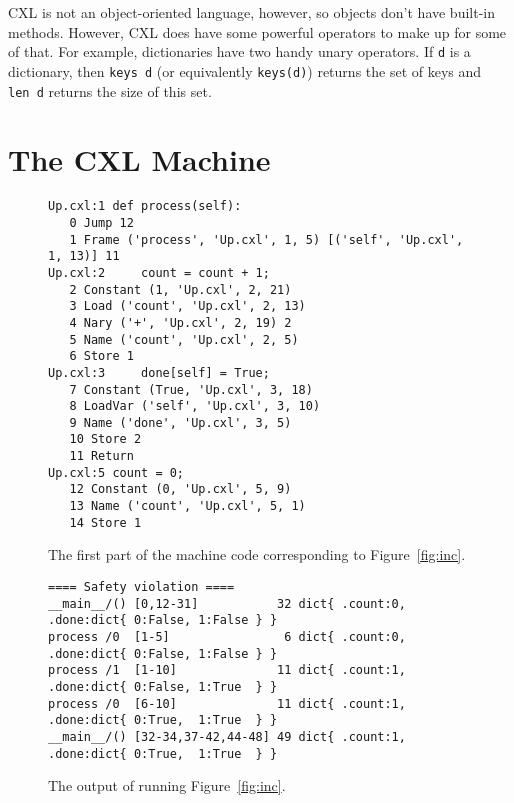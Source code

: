 \documentclass{report}
\newenvironment{code}{
\tcolorbox
}{
\endtcolorbox
}
\begin{document}
CXL is not an object-oriented language, however, so objects don't have
built-in methods.  However, CXL does have some powerful operators to
make up for some of that.
For example, dictionaries have two handy unary operators.
If \texttt{d} is a
dictionary, then \texttt{keys~d} (or equivalently \texttt{keys(d)})
returns the set of keys and \texttt{len~d} returns the size of
this set.

\chapter{The CXL Machine}
\label{ch:cxlmachine}

\begin{figure}
\begin{code}
\begin{verbatim}
Up.cxl:1 def process(self):
   0 Jump 12
   1 Frame ('process', 'Up.cxl', 1, 5) [('self', 'Up.cxl', 1, 13)] 11
Up.cxl:2     count = count + 1;
   2 Constant (1, 'Up.cxl', 2, 21)
   3 Load ('count', 'Up.cxl', 2, 13)
   4 Nary ('+', 'Up.cxl', 2, 19) 2
   5 Name ('count', 'Up.cxl', 2, 5)
   6 Store 1
Up.cxl:3     done[self] = True;
   7 Constant (True, 'Up.cxl', 3, 18)
   8 LoadVar ('self', 'Up.cxl', 3, 10)
   9 Name ('done', 'Up.cxl', 3, 5)
   10 Store 2
   11 Return
Up.cxl:5 count = 0;
   12 Constant (0, 'Up.cxl', 5, 9)
   13 Name ('count', 'Up.cxl', 5, 1)
   14 Store 1
\end{verbatim}
\end{code}
\caption{The first part of the machine code corresponding to Figure~\ref{fig:inc}.}
\label{fig:inccode}
\end{figure}

\begin{figure}
\begin{code}
\begin{verbatim}
==== Safety violation ====
__main__/() [0,12-31]           32 dict{ .count:0, .done:dict{ 0:False, 1:False } }
process /0  [1-5]                6 dict{ .count:0, .done:dict{ 0:False, 1:False } }
process /1  [1-10]              11 dict{ .count:1, .done:dict{ 0:False, 1:True  } }
process /0  [6-10]              11 dict{ .count:1, .done:dict{ 0:True,  1:True  } }
__main__/() [32-34,37-42,44-48] 49 dict{ .count:1, .done:dict{ 0:True,  1:True  } }
\end{verbatim}
\end{code}
\caption{The output of running Figure~\ref{fig:inc}.}
\label{fig:incoutput}
\end{figure}
\end{document}
